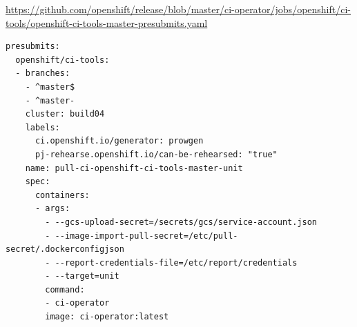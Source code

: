 \begin{frame}[fragile]
    \autotitle
    \scriptsize
    \url{https://github.com/openshift/release/blob/master/ci-operator/jobs/openshift/ci-tools/openshift-ci-tools-master-presubmits.yaml}
    \begin{verbatim}
presubmits:
  openshift/ci-tools:
  - branches:
    - ^master$
    - ^master-
    cluster: build04
    labels:
      ci.openshift.io/generator: prowgen
      pj-rehearse.openshift.io/can-be-rehearsed: "true"
    name: pull-ci-openshift-ci-tools-master-unit
    spec:
      containers:
      - args:
        - --gcs-upload-secret=/secrets/gcs/service-account.json
        - --image-import-pull-secret=/etc/pull-secret/.dockerconfigjson
        - --report-credentials-file=/etc/report/credentials
        - --target=unit
        command:
        - ci-operator
        image: ci-operator:latest
    \end{verbatim} %
\end{frame}

